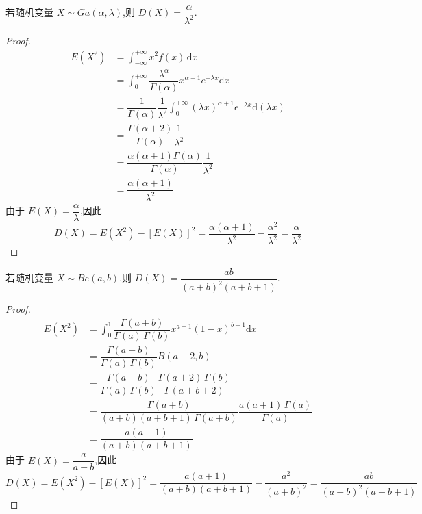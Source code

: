 \begin{conclusion}
    \indent 若随机变量 $X \sim Ga(\alpha,\lambda)$,则 $D(X) = \dfrac{\alpha}{\lambda^2}$.
\end{conclusion}

\begin{proof}
    $$
    \begin{aligned}
        E(X^2) &= \int_{-\infty}^{+\infty} x^2 f(x) \, \mathrm{d}x \\
        &= \int_{0}^{+\infty} \dfrac{\lambda^\alpha}{\Gamma(\alpha)} x^{\alpha + 1} e^{-\lambda x} \mathrm{d}x \\
        &= \dfrac{1}{\Gamma(\alpha)} \dfrac{1}{\lambda^2} \int_{0}^{+\infty} (\lambda x)^{\alpha + 1} e^{-\lambda x} \mathrm{d}(\lambda x) \\
        &= \dfrac{\Gamma(\alpha + 2)}{\Gamma(\alpha)} \dfrac{1}{\lambda^2} \\
        &= \dfrac{\alpha (\alpha + 1) \Gamma(\alpha)}{\Gamma(\alpha)} \dfrac{1}{\lambda^2} \\
        &= \dfrac{\alpha (\alpha + 1)}{\lambda^2}
    \end{aligned}
    $$
    由于 $E(X) = \dfrac{\alpha}{\lambda}$,因此
    $$
    D(X) = E(X^2) - [E(X)]^2 = \dfrac{\alpha (\alpha + 1)}{\lambda^2} - \dfrac{\alpha^2}{\lambda^2} = \dfrac{\alpha}{\lambda^2}
    $$
\end{proof}

\begin{conclusion}
    \indent 若随机变量 $X \sim Be(a,b)$,则 $D(X) = \dfrac{ab}{(a+b)^2 (a+b+1)}$.
\end{conclusion}

\begin{proof}
    $$
    \begin{aligned}
        E(X^2) &= \int_{0}^1 \dfrac{\Gamma(a+b)}{\Gamma(a) \, \Gamma(b)} x^{a+1} (1-x)^{b-1} \mathrm{d}x \\
        &= \dfrac{\Gamma(a+b)}{\Gamma(a) \, \Gamma(b)} B(a+2, b) \\
        &= \dfrac{\Gamma(a+b)}{\Gamma(a) \, \Gamma(b)} \dfrac{\Gamma(a+2) \, \Gamma(b)}{\Gamma(a+b+2)} \\
        &= \dfrac{\Gamma(a+b)}{(a+b)(a+b+1) \, \Gamma(a+b)} \dfrac{a(a+1) \, \Gamma(a)}{\Gamma(a)} \\
        &= \dfrac{a(a+1)}{(a+b)(a+b+1)}
    \end{aligned}
    $$
    由于 $E(X) = \dfrac{a}{a+b}$,因此
    $$
    D(X) = E(X^2) - [E(X)]^2 = \dfrac{a(a+1)}{(a+b)(a+b+1)} - \dfrac{a^2}{(a+b)^2} = \dfrac{ab}{(a+b)^2 (a+b+1)}
    $$
\end{proof}

